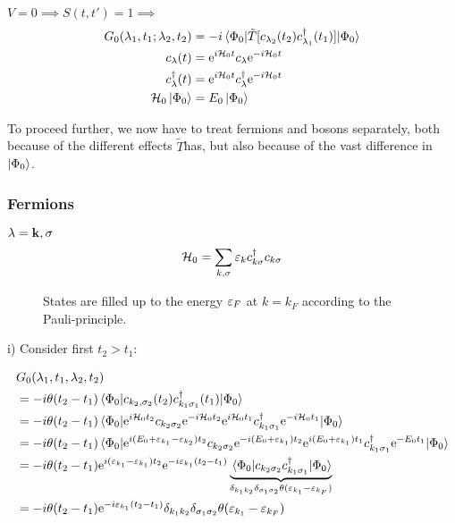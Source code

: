 $V =0 \implies S(t, t') = 1 \implies$
\begin{align} 
G_0(\lambda_1, t_1; \lambda_2, t_2) &= -i\ev{\tilde{T}[c_{\lambda_2}(t_2)c_{\lambda_1}^\dagger(t_1)]}{\Phi_0}
\\
c_\lambda(t) &= \e^{i\Ha_0t}c_\lambda\e^{-i\Ha_0t} \\
c_\lambda^\dagger(t) &=
\e^{i\Ha_0t}c_\lambda^\dagger\e^{-i\Ha_0t} \\
\Ha_0\ket{\Phi_0} &= E_0\ket{\Phi_0}
\end{align}

To proceed further, we now have to treat fermions and bosons separately, both because of the different effects  $\tilde{T}$has, but also because of the vast difference in $\ket{\Phi_0}$.

\subsubsection{Fermions}

$\lambda = \vb k, \sigma$
\begin{equation} 
\mathcal{H}_0 = \sum_{k, \sigma}\varepsilon_kc^{\dagger}_{ k\sigma}c_{k\sigma}
\end{equation}


\begin{figure}
	\centering
	
\end{figure}

\begin{figure}
	\centering
	
	\caption{States are filled up to the energy $\varepsilon_F$ at $k = k_F$ according to the Pauli-principle.}
\end{figure}

i) Consider first $t_2 >t_1$:

\begin{align*} 
&G_0(\lambda_1, t_1, \lambda_2, t_2) \\
 &=-i\theta(t_2-t_1)\ev{c_{k_2,\sigma_2}(t_2)c_{k_1\sigma_1}^\dagger(t_1)}{\Phi_0} \\
&=-i\theta(t_2-t_1)\ev{\e^{i\Ha_0t_2}c_{k_2\sigma_2}\e^{-i\Ha_0t_2}\e^{i\Ha_0t_1}c_{k_1\sigma_1}^\dagger\e^{-i\Ha_0t_1}}{\Phi_0} \\
&= -i\theta(t_2 - t_1) \ev{\e^{i(E_0 + \ep_{k_1}-\ep_{k_2})t_2}c_{k_2\sigma_2}\e^{-i(E_0 + \ep_{k_1})t_2}\e^{i(E_0 + \ep_{k_1})t_1}c_{k_1\sigma_1}^\dagger\e^{-E_0t_1}}{\Phi_0} \\
&= -i\theta(t_2-t_1)\e^{i(\ep_{k_1}-\ep_{k_1})t_2}\e^{-i\ep_{k_1}(t_2-t_1)}\underbrace{\ev{c_{k_2\sigma_2}c_{k_1\sigma_1}^\dagger}{\Phi_0}}_{\delta_{k_1k_2}\delta_{\sigma_1\sigma_2}\theta(\ep_{k_1} - \ep_{k_F})} \\
&= -i\theta(t_2-t_1)\e^{-i\ep_{k_1}(t_2-t_1)}\delta_{k_1k_2}\delta_{\sigma_1\sigma_2}\theta(\ep_{k_1} - \ep_{k_F})
\end{align*}


